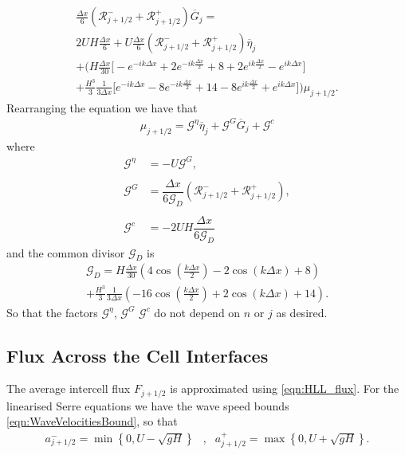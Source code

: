 \begin{multline*}
\frac{\Delta x}{6} \left(\mathcal{R}^-_{j +1/2} + \mathcal{R}^+_{j +1/2} \right) \overline{G}_j =  \\
2UH\frac{\Delta x}{6}   + U\frac{\Delta x}{6} \left(\mathcal{R}^-_{j +1/2} + \mathcal{R}^+_{j +1/2} \right) \overline{\eta}_j\\ +   \Bigg(H\frac{\Delta x}{30} \Bigg[ -e^{-ik\Delta x } +  2 e^{-ik\frac{\Delta x}{2}}  + 8 + 2 e^{ik\frac{\Delta x}{2}} - e^{ik{\Delta x}}  \Bigg]   \\ + \frac{H^3 }{3}\frac{1 }{3\Delta x} \Bigg[  e^{-ik{\Delta x}} -8e^{-ik\frac{\Delta x}{2}} + 14  - 8 e^{ik\frac{\Delta x}{2}} + e^{ik{\Delta x}}  \Bigg]    \Bigg) \mu_{j+1/2}. 
\end{multline*}
Rearranging the equation we have that
\begin{align}
\label{eqn:2ndFEMutoG}
\mu_{j+1/2} =  \mathcal{G}^{\eta} \overline{\eta}_{j} + \mathcal{G}^G \overline{G}_{j} + \mathcal{G}^c 
\end{align}
where
\begin{align*}
\mathcal{G}^\eta &=  -U\mathcal{G}^G, \\ \\
\mathcal{G}^G &= \dfrac{\Delta x}{6\mathcal{G}_D } \left(\mathcal{R}^-_{j +1/2} + \mathcal{R}^+_{j +1/2} \right), \\ \\
\mathcal{G}^c &=  -2UH \dfrac{\Delta x}{6\mathcal{G}_D }
\end{align*}
and the common divisor $\mathcal{G}_D$ is
\begin{multline*}
\mathcal{G}_D = H\frac{\Delta x}{30} \left(4\cos\left(\frac{k \Delta x}{2}\right) - 2\cos\left({k \Delta x}\right) + 8\right) \\ + \frac{H^3 }{3}\frac{1}{3\Delta x}\left(-16\cos\left(\frac{k\Delta x}{2}\right) + 2 \cos\left(k \Delta x\right) + 14\right).
\end{multline*}
So that the factors $\mathcal{G}^\eta$, $\mathcal{G}^G$ $\mathcal{G}^c$ do not depend on $n$ or $j$ as desired.

\subsection{Flux Across the Cell Interfaces}
The average intercell flux $F_{j+1/2}$ is approximated using \eqref{eqn:HLL_flux}. For the linearised Serre equations we have the wave speed bounds \eqref{eqn:WaveVelocitiesBound}, so that
\begin{align}
a^-_{j+ 1/2} = \min \left\lbrace 0,  U - \sqrt{g H} \right \rbrace&, &a^+_{j+ 1/2} =  \max \left\lbrace 0, U + \sqrt{g H} \right \rbrace .
\label{eqn:wavespeedboundslinSerre}
\end{align}

